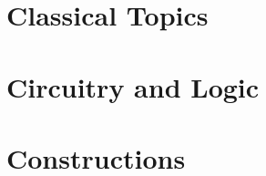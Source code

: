 \documentclass[11pt]{book}
\begin{document}



\mainmatter


\renewcommand{\chaptermark}[1]{\markboth{\sffamily\normalsize\bfseries\chaptername\ \thechapter.\ #1}{}} %



\part{Classical Topics}













\part{Circuitry and Logic}












\part{Constructions}








\end{document}
